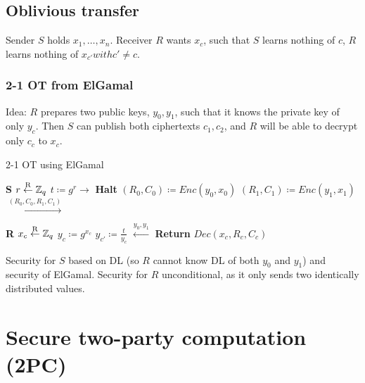 \subsection{Oblivious transfer}

Sender $S$ holds $x_1, \ldots, x_n$. Receiver $R$ wants $x_c$, such that $S$
learns nothing of $c$, $R$ learns nothing of $x_{c'} with c' \neq c$.


\subsubsection{2-1 OT from ElGamal}


Idea: $R$ prepares two public keys, $y_0, y_1$, such that it knows the private
key of only $y_c$. Then $S$ can publish both ciphertexts $c_1, c_2$, and $R$
will be able to decrypt only $c_c$ to $x_c$.

\begin{algorithm}
		\caption{2-1 OT using ElGamal}

		\begin{multicols}{2}
				\begin{algorithmic}[0]
						\State \textbf{S}
						\State $r \overset{\mathrm{R}}{\gets} \mathbb{Z}_q$
						\State $t \coloneqq g^{r} \rightarrow$
						\State
						\State
						\State
						\State
						\State \textbf{Halt}
						\EndIf
						\State $(R_0, C_0) \coloneqq Enc(y_0, x_0)$
						\State $(R_1, C_1) \coloneqq Enc(y_1, x_1)$
						\State $\xrightarrow{(R_0, C_0, R_1, C_1)}$
				\end{algorithmic}

				\columnbreak

				\begin{algorithmic}[0]
						\State \textbf{R}
						\State
						\State
						\State $x_c \overset{\mathrm{R}}{\gets} \mathbb{Z}_q$
						\State $y_c \coloneqq g^{x_c}$
						\State $y_{c'} \coloneqq \frac{t}{y_c}$
						\State $\xleftarrow{y_0, y_1}$
						\State
						\State
						\State
						\State
						\State
						\State \textbf{Return} $Dec(x_c, R_c, C_c)$
				\end{algorithmic}
		\end{multicols}
\end{algorithm}

Security for $S$ based on DL (so $R$ cannot know DL of both $y_0$ and $y_1$)
and security of ElGamal. Security for $R$ unconditional, as it only sends two
identically distributed values.

\section{Secure two-party computation (2PC)}


